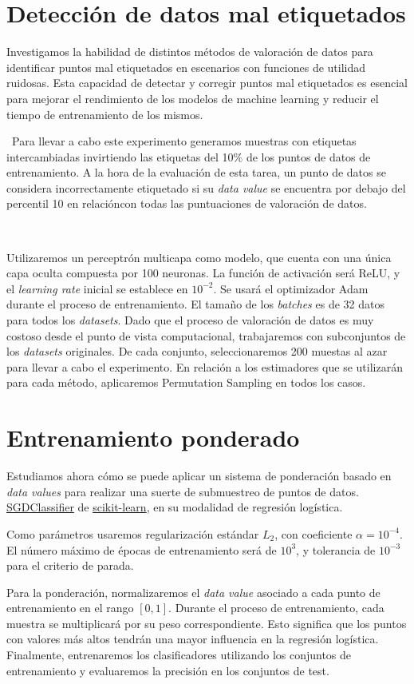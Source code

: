 \section{Detección de datos mal etiquetados}

Investigamos la habilidad de distintos métodos de
valoración de datos para identificar puntos mal
etiquetados en escenarios con funciones de utilidad ruidosas.
Esta capacidad de detectar y corregir puntos mal etiquetados
es esencial para mejorar el rendimiento de los modelos de
machine learning y reducir el tiempo de entrenamiento de
los mismos.

\
Para llevar a cabo este experimento generamos muestras
con etiquetas intercambiadas invirtiendo las
etiquetas del 10\% de los puntos de datos de entrenamiento.
A la hora de la evaluación de esta tarea, un punto de
datos se considera incorrectamente etiquetado si su
\textit{data value} se encuentra por debajo del percentil
10 en relacióncon todas las puntuaciones de valoración de datos.

\

Utilizaremos un perceptrón multicapa como modelo, que cuenta
con una única capa oculta compuesta por 100 neuronas. La
función de activación será ReLU, y el \textit{learning rate}
inicial se establece en $10^{-2}$. Se usará el optimizador
Adam durante el proceso de entrenamiento. El tamaño de los
\textit{batches} es de 32 datos para todos los
\textit{datasets}. Dado que el proceso de valoración de datos
es muy costoso desde el punto de vista computacional, trabajaremos
con subconjuntos de los \textit{datasets} originales. De cada
conjunto, seleccionaremos 200 muestas al azar para
llevar a cabo el experimento. En relación a los estimadores que
se utilizarán para cada método, aplicaremos Permutation Sampling
en todos los casos.

\section{Entrenamiento ponderado}

Estudiamos ahora cómo se puede aplicar un sistema de
ponderación basado en \textit{data values} para realizar
una suerte de submuestreo de puntos de datos.
\href{https://acortar.link/bclshR}{SGDClassifier} de
\href{https://scikit-learn.org/stable/index.html}{scikit-learn},
en su modalidad de regresión logística.

Como parámetros usaremos regularización estándar $L_2$,
con coeficiente $\alpha= 10^{-4}$. El número máximo
de épocas de entrenamiento será de $10^3$, y tolerancia
de $10^{-3}$ para el criterio de parada.

Para la ponderación, normalizaremos el \textit{data value}
asociado a cada punto de entrenamiento en el rango $[0,1]$.
Durante el proceso de entrenamiento, cada muestra se multiplicará por
su peso correspondiente. Esto significa que los puntos con
valores más altos tendrán una mayor influencia en la regresión
logística. Finalmente, entrenaremos los clasificadores
utilizando los conjuntos de entrenamiento y evaluaremos la
precisión en los conjuntos de test.



